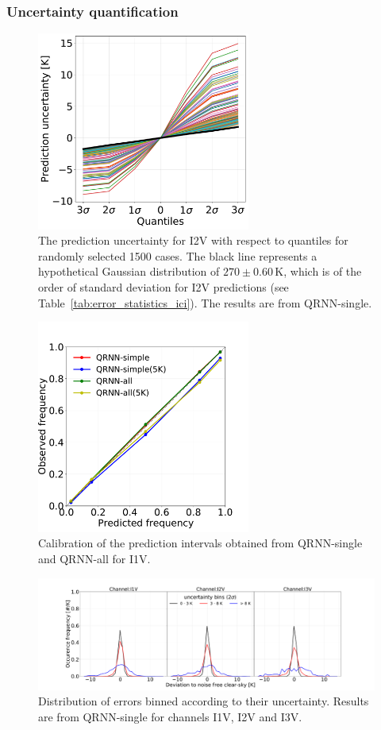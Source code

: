 \documentclass[amt, manuscript]{copernicus}
\begin{document}
\subsubsection{Uncertainty quantification}
\label{sec:prediction_uncertainty}
\begin{figure}[t]
	\includegraphics[width = 70mm]{Figures/prediction_uncertainty_I2V.pdf}	
	\caption{The prediction uncertainty  for I2V  with respect to quantiles for randomly selected 1500 cases. The black line represents a hypothetical Gaussian distribution of $270\pm0.60$\,K, which is of the order of standard deviation for I2V predictions (see Table~\ref{tab:error_statistics_ici}). The results are from QRNN-single.}
	\label{fig:prediction_uncertainty_I2V}	
\end{figure}
\begin{figure}[t]
	\includegraphics[height = 70mm]{Figures/calibration_QRNN_I1V.pdf}	
	\caption{Calibration of the prediction intervals obtained from QRNN-single and QRNN-all for I1V. }
	\label{fig:calibration_I1V}	
\end{figure}
\begin{figure}[t]
	\includegraphics[width=\textwidth]{Figures/PDF_uncertainty_bins_QRNN-single.pdf}	
	\caption{Distribution of errors binned according to their uncertainty. Results are from QRNN-single for channels I1V, I2V and I3V.}
	\label{fig:error_distribution_uncertainty_bins}	
\end{figure}
\end{document}
